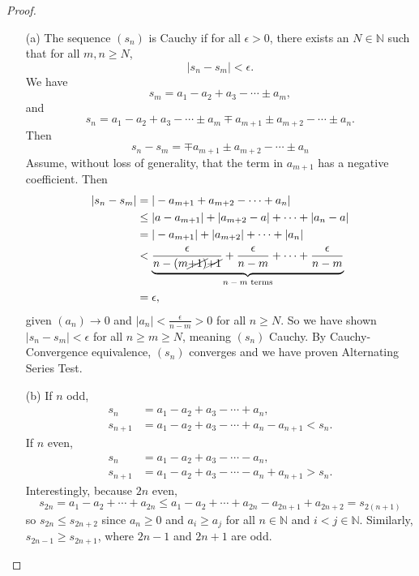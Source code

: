 \documentclass[11pt,twoside, reqno]{amsart}
\theoremstyle{remark}
\def\N{\mathbb N}
\begin{document}
\begin{proof}
\begin{enumerate}
    \item [(a)] The sequence $(s_n)$ is Cauchy if for all $\epsilon > 0$, there exists an $N \in \N$ such that for all $m,n \geq N$, 
    $$
        |s_n - s_m| < \epsilon.
    $$
    We have 
    $$
        s_m = a_1 - a_2 + a_3 - \cdots \pm a_m, 
    $$
    and
    $$
        s_n = a_1 - a_2 + a_3 - \cdots \pm a_m \mp a_{m+1} \pm a_{m+2} - \cdots \pm a_n.
    $$
    Then
    $$
        s_n - s_m = \mp a_{m+1} \pm a_{m+2} - \cdots \pm a_n
    $$
    Assume, without loss of generality, that the term in $a_{m+1}$ has a negative coefficient. Then
    \begin{align*}
        |s_n - s_m| &= |-a_{m+1} + a_{m+2} - \cdots + a_n| \\
        &\leq |a - a_{m+1}| + |a_{m+2} - a| + \cdots + |a_n - a| \\
        &= |-a_{m+1}| + |a_{m+2}| + \cdots + |a_n|\\
        &< \underbrace{\frac{\epsilon}{n-(m\cancel{+1)}\cancel{+1}} + \frac{\epsilon}{n-m} + \cdots + \frac{\epsilon}{n-m}}_{\text{$n-m$ terms}}\\
        &= \epsilon,
    \end{align*}
    given $(a_n) \to 0$ and $|a_n| < \frac{\epsilon}{n-m} > 0$ for all $n \geq N$. So we have shown $|s_n - s_m| < \epsilon$ for all $n \geq m \geq N$, meaning $(s_n)$ Cauchy. By Cauchy-Convergence equivalence, $(s_n)$ converges and we have proven Alternating Series Test.
    \item [(b)] If $n$ odd,
    \begin{align*}
        s_n &= a_1 - a_2 + a_3 - \cdots + a_n, \\
        s_{n+1} &= a_1 - a_2 + a_3 - \cdots + a_n - a_{n+1} < s_n.
    \end{align*}
    If $n$ even,
    \begin{align*}
        s_n &= a_1 - a_2 + a_3 - \cdots - a_n, \\
        s_{n+1} &= a_1 - a_2 + a_3 - \cdots - a_n + a_{n+1} > s_n.
    \end{align*}
    Interestingly, because $2n$ even,
    $$
        s_{2n} = a_1 - a_2 + \cdots + a_{2n} \leq a_1 - a_2 + \cdots + a_{2n} - a_{2n+1} + a_{2n+2} = s_{2(n+1)}
    $$
    so $s_{2n} \leq s_{2n+2}$ since $a_n \geq 0$ and $a_i \geq a_{j}$ for all $n \in \N$ and $i < j \in \N$. Similarly, $s_{2n-1} \geq s_{2n+1}$, where $2n-1$ and $2n+1$ are odd.
    

\end{enumerate}
\end{proof}
\end{document}
